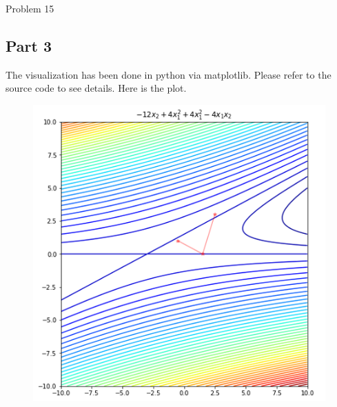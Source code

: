 \documentclass[12pt]{article}
\begin{document}
\begin{section}{Problem 15}
	\subsection{Part 3}
	The visualization has been done in python via matplotlib. Please refer to the source code to see details. Here is the plot. 
		\begin{figure}[htp]
		\centering
		\includegraphics[width=12cm]{problem15_plt1.png}
	\end{figure}

\end{section}
\end{document}
